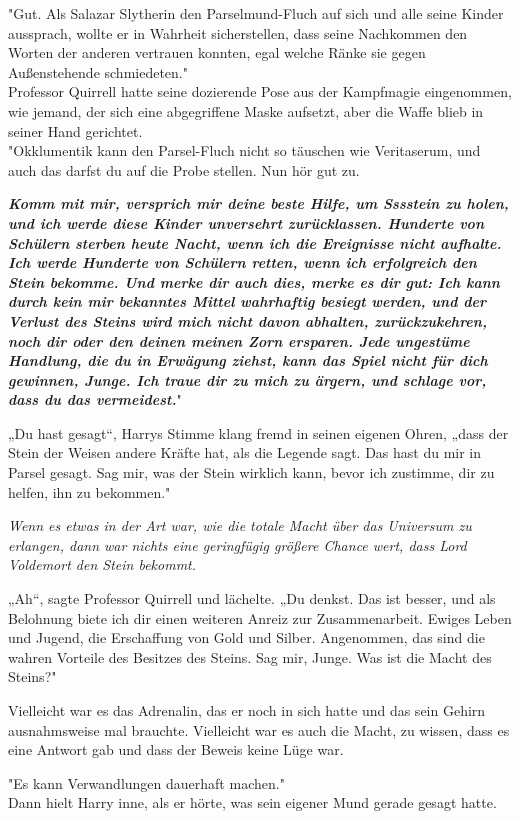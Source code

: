 {"Gut. Als Salazar Slytherin den Parselmund-Fluch auf sich und alle seine Kinder aussprach, wollte er in Wahrheit sicherstellen, dass seine Nachkommen den Worten der anderen vertrauen konnten, egal welche Ränke sie gegen Außenstehende schmiedeten."\\ Professor Quirrell hatte seine dozierende Pose aus der Kampfmagie eingenommen, wie jemand, der sich eine abgegriffene Maske aufsetzt, aber die Waffe blieb in seiner Hand gerichtet.\\ "Okklumentik kann den Parsel-Fluch nicht so täuschen wie Veritaserum, und auch das darfst du auf die Probe stellen. Nun hör gut zu.

\textbf{\emph{Komm mit mir, versprich mir deine beste Hilfe, um Sssstein zu holen, und ich werde diese Kinder unversehrt zurücklassen. Hunderte von Schülern sterben heute Nacht, wenn ich die Ereignisse nicht aufhalte. Ich werde Hunderte von Schülern retten, wenn ich erfolgreich den Stein bekomme. Und merke dir auch dies, merke es dir gut: Ich kann durch kein mir bekanntes Mittel wahrhaftig besiegt werden, und der Verlust des Steins wird mich nicht davon abhalten, zurückzukehren, noch dir oder den deinen meinen Zorn ersparen. Jede ungestüme Handlung, die du in Erwägung ziehst, kann das Spiel nicht für dich gewinnen, Junge. Ich traue dir zu mich zu ärgern, und schlage vor, dass du das vermeidest.}}"

„Du hast gesagt“, Harrys Stimme klang fremd in seinen eigenen Ohren, „dass der Stein der Weisen andere Kräfte hat, als die Legende sagt. Das hast du mir in Parsel gesagt. Sag mir, was der Stein wirklich kann, bevor ich zustimme, dir zu helfen, ihn zu bekommen."

\emph{Wenn es etwas in der Art war, wie die totale Macht über das Universum zu erlangen, dann war nichts eine geringfügig größere Chance wert, dass Lord Voldemort den Stein bekommt.}

„Ah“, sagte Professor Quirrell und lächelte. „Du denkst. Das ist besser, und als Belohnung biete ich dir einen weiteren Anreiz zur Zusammenarbeit. Ewiges Leben und Jugend, die Erschaffung von Gold und Silber. Angenommen, das sind die wahren Vorteile des Besitzes des Steins. Sag mir, Junge. Was ist die Macht des Steins?"

Vielleicht war es das Adrenalin, das er noch in sich hatte und das sein Gehirn ausnahmsweise mal brauchte. Vielleicht war es auch die Macht, zu wissen, dass es eine Antwort gab und dass der Beweis keine Lüge war.

"Es kann Verwandlungen dauerhaft machen."\\ Dann hielt Harry inne, als er hörte, was sein eigener Mund gerade gesagt hatte.

}
